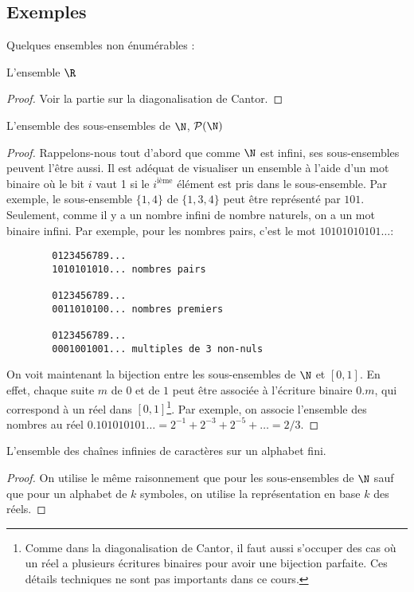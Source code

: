 \subsection{Exemples}
\label{subsec:exemples_non_enum}

Quelques ensembles non énumérables :
\begin{myexem}
 L'ensemble $\R$
 \begin{proof}
   Voir la partie sur la diagonalisation de Cantor.
 \end{proof}
\end{myexem}

\begin{myexem}
 L'ensemble des sous-ensembles de $\N$, $\mathcal{P}(\N)$
 \begin{proof}
   Rappelons-nous tout d'abord que comme $\N$ est infini, ses sous-ensembles peuvent l'être aussi.
   Il est adéquat de visualiser un ensemble à l'aide d'un mot binaire
   où le bit $i$ vaut 1 si le $i^{\mathrm{ième}}$ élément est pris dans le sous-ensemble.
   Par exemple, le sous-ensemble $\{1,4\}$ de $\{1,3,4\}$ peut être représenté par $101$.
   Seulement, comme il y a un nombre infini de nombre naturels, on a un mot binaire infini.
   Par exemple, pour les nombres pairs, c'est le mot $10101010101\ldots$:
   \begin{verbatim}
		0123456789...
		1010101010... nombres pairs

		0123456789...
		0011010100... nombres premiers

		0123456789...
		0001001001... multiples de 3 non-nuls
    \end{verbatim}
   On voit maintenant la bijection entre les sous-ensembles de $\N$ et $[0,1]$.
   En effet, chaque suite $m$ de $0$ et de $1$ peut être associée à l'écriture binaire $0.m$, qui correspond à un réel dans $[0,1]$\footnote{Comme dans la diagonalisation de Cantor, il faut aussi s'occuper des cas où un réel a plusieurs écritures binaires pour avoir une bijection parfaite. Ces détails techniques ne sont pas importants dans ce cours.}. Par exemple, on associe l'ensemble des nombres au réel $0.101010101\ldots = 2^{-1}+2^{-3}+2^{-5}+\ldots = 2/3$.
 \end{proof}
\end{myexem}

\begin{myexem}
 L'ensemble des chaînes infinies de caractères sur un alphabet fini.
 \begin{proof}
   On utilise le même raisonnement que pour les sous-ensembles de $\N$ sauf que pour un alphabet de $k$ symboles,
   on utilise la représentation en base $k$ des réels.
 \end{proof}
\end{myexem}


